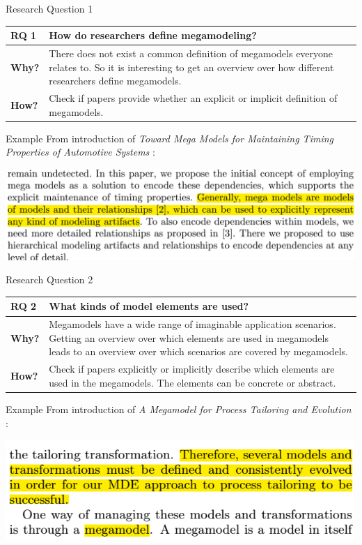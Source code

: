 \documentclass{beamer}
\begin{document}
\begin{frame}{Research Question 1}
\begin{tabular}{|l|p{9cm}|}\hline
\textbf{RQ 1} & How do researchers define megamodeling?\\\hline
\textbf{Why?} & There does not exist a common definition of me\-ga\-mo\-dels everyone relates to. So it is interesting to get an overview over how different researchers define megamodels.\\\hline
\textbf{How?} & Check if papers provide whether an explicit or implicit definition of megamodels.\\\hline
\end{tabular}
\end{frame}

\begin{frame}{Example}
From introduction of \textit{Toward Mega Models for Maintaining Timing Properties of Automotive Systems} \cite{Neumann_models2010}:
\begin{center}
\includegraphics[width=1.0\textwidth]{ex_rq1}
\end{center}
\end{frame}

\begin{frame}{Research Question 2}
\begin{tabular}{|l|p{9cm}|}\hline
\textbf{RQ 2} & What kinds of model elements are used?\\\hline
\textbf{Why?} & Megamodels have a wide range of imaginable application scenarios. Getting an overview over which elements are used in megamodels leads to an overview over which scenarios are covered by megamodels.\\\hline
\textbf{How?} & Check if papers explicitly or implicitly describe which elements are used in the megamodels. The elements can be concrete or abstract.\\\hline
\end{tabular}
\end{frame}

\begin{frame}{Example}
From introduction of \textit{A Megamodel for Process Tailoring and Evolution} \cite{tailoring}:
\begin{center}
\includegraphics[width=1.0\textwidth]{ex_rq2}
\end{center}
\end{frame}
\end{document}
